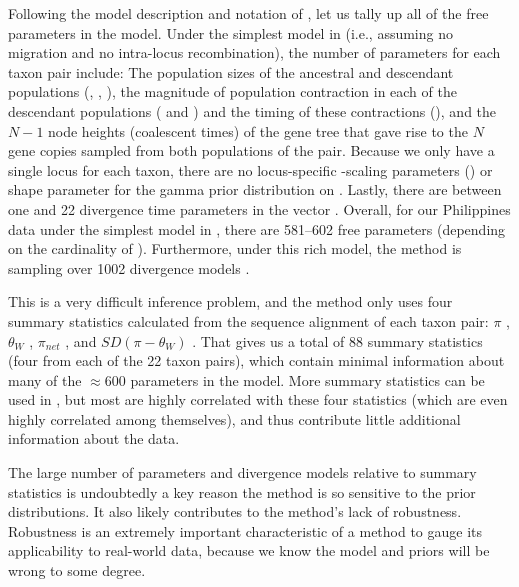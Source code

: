 \documentclass[letterpaper,12pt]{article}
\begin{document}
\begin{linenumbers}
Following the model description and notation of \citet{Oaks2012}, let us tally
up all of the free parameters in the \msb model.  Under the simplest model in
\msb (i.e., assuming no migration and
no intra-locus recombination), the number of parameters for each
taxon pair include:
The population sizes of the ancestral and descendant populations
(\ancestralTheta{}, , ),
the magnitude of population contraction in each of the descendant
populations ( and ) and the
timing of these contractions (\bottleTime{}), and the $N-1$ node heights
(coalescent times) of the gene tree that gave rise to the $N$ gene
copies sampled from both populations of the pair.
Because we only have a single locus for each taxon, there are no locus-specific
\myTheta{}-scaling parameters (\locusMutationRateScalar{}) or
\locusRateHetShapeParameter shape parameter for the gamma prior distribution on
\locusMutationRateScalar{}.
Lastly, there are between one and 22 divergence time parameters \divt{} in
the vector \divtvector.
Overall, for our Philippines data under the simplest model in \msb, there are
581--602 free parameters (depending on the cardinality of \divtvector).
Furthermore, under this rich model, the method is sampling over 1002 divergence
models \citep[i.e., the number of integer partitions of $Y=22$;][]{Oaks2012}.

This is a very difficult inference problem, and the method only uses four
summary statistics calculated from the sequence alignment of each taxon pair:
$\pi$ \citep{Tajima1983}, $\theta_W$ \citep{Watterson1975}, $\pi_{net}$
\citep{Takahata1985}, and $SD(\pi-\theta_W)$ \citep{Tajima1989}.
That gives us a total of 88 summary statistics (four from each of the 22 taxon
pairs), which contain minimal information about many of the $\approx 600$
parameters in the model.
More summary statistics can be used in \msb, but most are highly correlated
with these four statistics (which are even highly correlated among themselves),
and thus contribute little additional information about the data.

The large number of parameters and divergence models relative to 
summary statistics is undoubtedly a key reason the method is so sensitive
to the prior distributions.
It also likely contributes to the method's lack of robustness.
Robustness is an extremely important characteristic of a method to gauge its
applicability to real-world data, because we know the model and priors will be
wrong to some degree.


\end{linenumbers}
\end{document}
